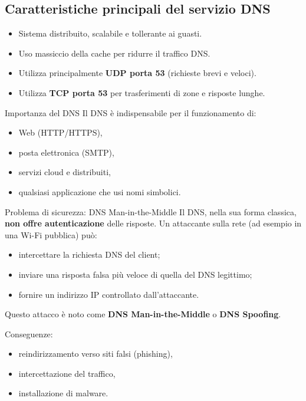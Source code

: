\documentclass[a4paper,12pt]{report}
\begin{document}
\subsection*{Caratteristiche principali del servizio DNS}

\begin{itemize}
    \item Sistema distribuito, scalabile e tollerante ai guasti.
    \item Uso massiccio della cache per ridurre il traffico DNS.
    \item Utilizza principalmente \textbf{UDP porta 53} (richieste brevi e veloci).
    \item Utilizza \textbf{TCP porta 53} per trasferimenti di zone e risposte lunghe.
\end{itemize}

\begin{notebox}{Importanza del DNS}
Il DNS è indispensabile per il funzionamento di:
\begin{itemize}
    \item Web (HTTP/HTTPS),
    \item posta elettronica (SMTP),
    \item servizi cloud e distribuiti,
    \item qualsiasi applicazione che usi nomi simbolici.
\end{itemize}
\end{notebox}


\begin{notebox}{Problema di sicurezza: DNS Man-in-the-Middle}
Il DNS, nella sua forma classica, \textbf{non offre autenticazione} delle risposte.
Un attaccante sulla rete (ad esempio in una Wi-Fi pubblica) può:

\begin{itemize}
    \item intercettare la richiesta DNS del client;
    \item inviare una risposta falsa più veloce di quella del DNS legittimo;
    \item fornire un indirizzo IP controllato dall’attaccante.
\end{itemize}

Questo attacco è noto come \textbf{DNS Man-in-the-Middle} o \textbf{DNS Spoofing}.

Conseguenze:
\begin{itemize}
    \item reindirizzamento verso siti falsi (phishing),
    \item intercettazione del traffico,
    \item installazione di malware.
\end{itemize}

\end{notebox}
\end{document}
